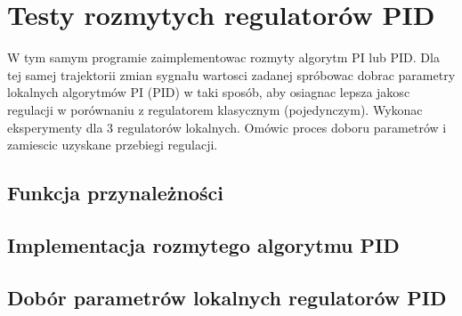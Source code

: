 \section{Testy rozmytych regulatorów PID}
\label{lab:zad4}

W tym samym programie zaimplementowac rozmyty algorytm PI lub PID. Dla tej samej
trajektorii zmian sygnału wartosci zadanej spróbowac dobrac parametry lokalnych
algorytmów PI (PID) w taki sposób, aby osiagnac lepsza jakosc regulacji w porównaniu
z regulatorem klasycznym (pojedynczym). Wykonac eksperymenty dla 3 regulatorów
lokalnych. Omówic proces doboru parametrów i zamiescic uzyskane przebiegi regulacji.

%    

\subsection{Funkcja przynależności}
\label{lab:zad4:fuzzyFunction}


\newpage

\subsection{Implementacja rozmytego algorytmu PID}
\label{lab:zad4:implPID}


\newpage

\subsection{Dobór parametrów lokalnych regulatorów PID}
\label{lab:zad4:paramPID}

\newpage
